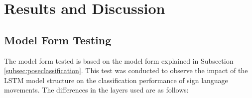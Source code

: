 



% 


\section{Results and Discussion}
\label{sec:resultsanddiscussion}




% 


\subsection{Model Form Testing}
\label{sec:modelanalysis}
The model form tested is based on the model form explained in Subsection \ref{subsec:poseclassification}. This test was conducted to observe the impact of the LSTM model structure on the classification performance of sign language movements. The differences in the layers used are as follows:

